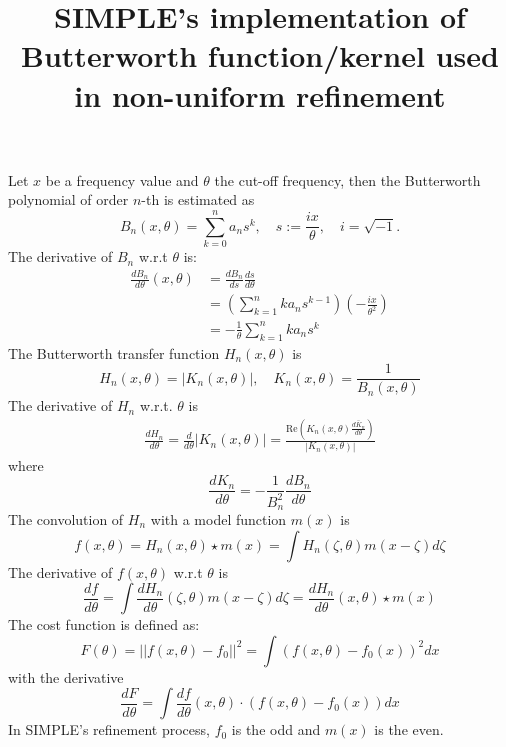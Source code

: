 \documentclass{article}
\begin{document}
\title{SIMPLE's implementation of Butterworth function/kernel used in non-uniform refinement}
\maketitle
\noindent Let $x$ be a frequency value and $\theta$ the cut-off frequency, then the Butterworth polynomial of order $n$-th is estimated \cite{ButterworthWiki} as
\begin{equation}\label{eq1}
B_n(x,\theta) = \sum_{k = 0}^n a_n s^k, \quad s := \frac{ix}{\theta}, \quad i = \sqrt{-1}.
\end{equation}
The derivative of $B_n$ w.r.t $\theta$ is:
\begin{align}
\frac{dB_n}{d\theta}(x,\theta) &= \frac{dB_n}{ds}\frac{ds}{d\theta} \\
&= \left( \sum_{k = 1}^n ka_ns^{k-1} \right) \left(-\frac{ix}{\theta^2}\right) \\
&= -\frac{1}{\theta}\sum_{k=1}^n ka_ns^k
\end{align}
The Butterworth transfer function $H_n(x,\theta)$ is
\begin{equation}\label{eq5}
H_n(x, \theta) = \left| K_n(x,\theta) \right|, \quad K_n(x, \theta) = \frac{1}{B_n(x, \theta)}
\end{equation}
The derivative of $H_n$ w.r.t. $\theta$ is
\begin{align}\label{eq6}
\frac{dH_n}{d\theta} = \frac{d}{d\theta}\left| K_n(x,\theta) \right| = \frac{\text{Re}\left(K_n(x,\theta)\overline{\frac{dK_n}{d\theta}}\right)}{\left| K_n(x,\theta) \right|}
\end{align}
where
\begin{equation}\label{eq7}
\frac{dK_n}{d\theta} = -\frac{1}{B_n^2}\frac{dB_n}{d\theta}
\end{equation}
The convolution of $H_n$ with a model function $m(x)$ is
\begin{equation}\label{eq8}
f(x,\theta) = H_n(x,\theta) \star m(x) = \int H_n(\zeta, \theta)m(x-\zeta)d\zeta
\end{equation} 
The derivative of $f(x,\theta)$ w.r.t $\theta$ is
\begin{equation}\label{eq9}
\frac{df}{d\theta} = \int\frac{dH_n}{d\theta}(\zeta,\theta)m(x-\zeta)d\zeta = \frac{dH_n}{d\theta}(x,\theta) \star m(x)
\end{equation}
The cost function is defined as:
\begin{equation}\label{eq10}
F(\theta) = ||f(x,\theta) - f_0||^2 = \int (f(x,\theta) - f_0(x))^2dx
\end{equation}
with the derivative
\begin{equation}\label{eq11}
\frac{dF}{d\theta} = \int \frac{df}{d\theta}(x,\theta) \cdot (f(x,\theta) - f_0(x))dx
\end{equation}
In SIMPLE's refinement process, $f_0$ is the odd and $m(x)$ is the even.\\
\end{document}
